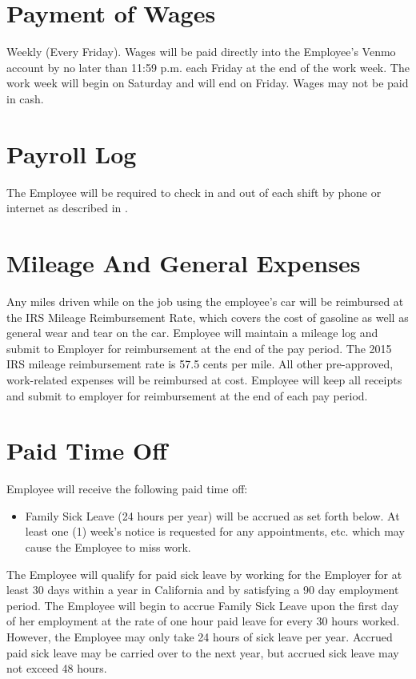 \documentclass[]{article}
\begin{document}
\section{Payment of Wages}

Weekly (Every Friday). Wages will be paid directly into the Employee's Venmo account by no later than 11:59 p.m. each Friday at the end of the work week. The work week will begin on Saturday and will end on Friday. Wages may not be paid in cash.

\section{Payroll Log}

The Employee will be required to check in and out of each shift by phone or internet as described in .

\section{Mileage And General Expenses}

Any miles driven while on the job using the employee's car will be reimbursed at the IRS Mileage Reimbursement Rate, which covers the cost of gasoline as well as general wear and tear on the car. Employee will maintain a mileage log and submit to Employer for reimbursement at the end of the pay period. The 2015 IRS mileage reimbursement rate is 57.5 cents per mile.  All other pre-approved, work-related expenses will be reimbursed at cost. Employee will keep all receipts and submit to employer for reimbursement at the end of each pay period.

\section{Paid Time Off}

Employee will receive the following paid time off:

\begin{itemize}
\item
  Family Sick Leave (24 hours per year) will be accrued as set forth below. At least one (1) week's notice is requested for any appointments, etc. which may cause the Employee to miss work.
\end{itemize}

The Employee will qualify for paid sick leave by working for the Employer for at least 30 days within a year in California and by satisfying a 90 day employment period. The Employee will begin to accrue Family Sick Leave upon the first day of her employment at the rate of one hour paid leave for every 30 hours worked. However, the Employee may only take 24 hours of sick leave per year. Accrued paid sick leave may be carried over to the next year, but accrued sick leave may not exceed 48 hours.
\end{document}

